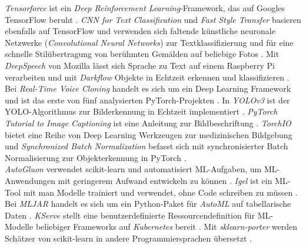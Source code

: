 \documentclass[german,bachelor]{swsLeipzig}
\begin{document}
\noindent \textit{Tensorforce} ist ein \textit{Deep Reinforcement Learning}-Framework, das auf Googles TensorFlow beruht \cite[]{tensorforce}.
\textit{CNN for Text Classification} und \textit{Fast Style Transfer} basieren ebenfalls auf TensorFlow und verwenden
sich faltende künstliche neuronale Netzwerke (\textit{Convolutional Neural Networks}) zur Textklassifizierung \cite[]{CNN_for_Text_Classification} und für eine
schnelle Stilübertragung von berühmten Gemälden auf beliebige Fotos \cite[]{Fast_Style_Transfer}.
Mit \textit{DeepSpeech} von Mozilla lässt sich Sprache zu Text auf einem Raspberry Pi verarbeiten \cite[]{DeepSpeech} und mit
\textit{Darkflow} Objekte in Echtzeit erkennen und klassifizieren \cite[]{Darkflow}.\\
\indent Bei \textit{Real-Time Voice Cloning} handelt es sich um ein Deep Learning Framework und ist das erste von fünf
analysierten PyTorch-Projekten \cite[]{Charles2013}.
In \textit{YOLOv3} ist der YOLO-Algorithmus zur Bilderkennung in Echtzeit implementiert \cite[]{YOLO_v3}.
\textit{PyTorch Tutorial to Image Captioning} ist eine Anleitung zur Bildbeschriftung \cite[]{a_PyTorch_Tutorial_to_Image_Captioning}.
\textit{TorchIO} bietet eine Reihe von Deep Learning Werkzeugen zur medizinischen Bildgebung \cite[]{perez-garcia_torchio_2021}
und \textit{Synchronized Batch Normalization} befasst sich mit synchronisierter Batch Normalisierung zur
Objekterkennung in PyTorch \cite[]{Synchronized_Batchnorm}.\\
\indent \textit{AutoGluon} verwendet scikit-learn und automatisiert ML-Aufgaben, um ML-Anwendungen mit geringerem
Aufwand entwickeln zu können \cite[]{agtabular}.
\textit{Igel} ist ein ML-Tool mit man Modelle trainiert und verwendet, ohne Code schreiben zu müssen \cite[]{igel}.
Bei \textit{MLJAR} handelt es sich um ein Python-Paket für \textit{AutoML} auf tabellarische Daten \cite[]{mljar}.
\textit{KServe} stellt eine benutzerdefinierte Ressourcendefinition für ML-Modelle beliebiger Frameworks
auf \textit{Kubernetes} bereit \cite[]{KServe}.
Mit \textit{sklearn-porter} werden Schätzer von scikit-learn in andere Programmiersprachen übersetzt \cite[]{sklearn_porter}.
\end{document}
